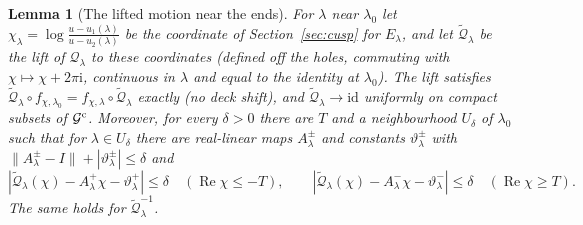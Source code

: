 \documentclass[11pt]{amsart}
\newtheorem{lemma}[theorem]{Lemma}
\theoremstyle{definition}
\newcommand{\ii}{\mathrm{i}}
\begin{document}
\begin{lemma}[The lifted motion near the ends]\label{lem:global-ends}
For $\lambda$ near $\lambda_0$ let $\chi_\lambda=\log\frac{u-u_1(\lambda)}{u-u_2(\lambda)}$ be the coordinate of
Section~\ref{sec:cusp} for $E_\lambda$, and let $\tilde{\mathcal Q}_\lambda$ be the lift of $\mathcal Q_\lambda$ to these
coordinates (defined off the holes, commuting with $\chi\mapsto\chi+2\pi\ii$, continuous
in $\lambda$ and equal to the identity at $\lambda_0$).  The lift satisfies $\tilde{\mathcal Q}_\lambda\circ f_{\chi,\lambda_0}=f_{\chi,\lambda}\circ\tilde{\mathcal Q}_\lambda$ exactly (no deck shift),
and $\tilde{\mathcal Q}_\lambda\to\mathrm{id}$ uniformly on compact subsets of $\mathcal G^{\rm c}$.  Moreover,
for every $\delta>0$ there are $T$ and a neighbourhood $U_\delta$ of $\lambda_0$ such that
for $\lambda\in U_\delta$ there are real-linear maps $A^\pm_\lambda$ and constants $\vartheta^\pm_\lambda$ with
$\|A^\pm_\lambda-I\|+|\vartheta^\pm_\lambda|\le\delta$ and
\[
 |\tilde{\mathcal Q}_\lambda(\chi)-A^+_\lambda\chi-\vartheta^+_\lambda|\le\delta\quad(\operatorname{Re}\chi\le-T),\qquad
 |\tilde{\mathcal Q}_\lambda(\chi)-A^-_\lambda\chi-\vartheta^-_\lambda|\le\delta\quad(\operatorname{Re}\chi\ge T).
\]
The same holds for $\tilde{\mathcal Q}_\lambda^{-1}$.
\end{lemma}
\end{document}

